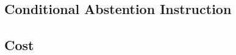 \subsection{Conditional Abstention Instruction}
\label{sec:method-abstain}

\subsection{Cost}
\label{sec:method-cost}
